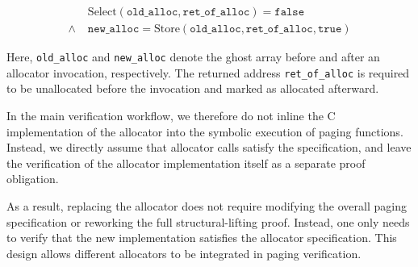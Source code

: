 \begin{equation}
\label{alloc}
\begin{aligned}
    &\text{Select}(\texttt{old\_alloc}, \texttt{ret\_of\_alloc}) = \texttt{false} \\
    \wedge\;&\texttt{new\_alloc} = \text{Store}(\texttt{old\_alloc}, \texttt{ret\_of\_alloc},  \texttt{true})
\end{aligned}
\end{equation}

Here, \texttt{old\_alloc} and \texttt{new\_alloc} denote the ghost array before and after an allocator invocation, respectively. The returned address \texttt{ret\_of\_alloc} is required to be unallocated before the invocation and marked as allocated afterward.

In the main verification workflow, we therefore do not inline the C implementation of the allocator into the symbolic execution of paging functions. Instead, we directly assume that allocator calls satisfy the specification, and leave the verification of the allocator implementation itself as a separate proof obligation.

As a result, replacing the allocator does not require modifying the overall paging specification or reworking the full structural-lifting proof. Instead, one only needs to verify that the new implementation satisfies the allocator specification. This design allows different allocators to be integrated in paging verification.


